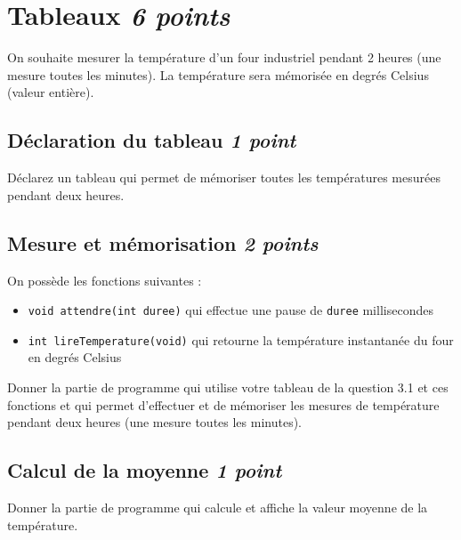 
\section{Tableaux \hfill \textit{6 points}}

On souhaite mesurer la température d'un four industriel pendant 2 heures (une mesure toutes les minutes). La température sera mémorisée en degrés Celsius (valeur entière).

\vspace{0.5em}

\subsection{Déclaration du tableau \hfill \textit{1 point}}

\UPSTIquestion
Déclarez un tableau qui permet de mémoriser toutes les températures mesurées pendant deux heures.

\espaceReponse{2cm}

\subsection{Mesure et mémorisation \hfill \textit{2 points}}

On possède les fonctions suivantes :
\begin{itemize}
    \item \texttt{void attendre(int duree)} qui effectue une pause de \texttt{duree} millisecondes
    \item \texttt{int lireTemperature(void)} qui retourne la température instantanée du four en degrés Celsius
\end{itemize}

\UPSTIquestion
Donner la partie de programme qui utilise votre tableau de la question 3.1 et ces fonctions et qui permet d'effectuer et de mémoriser les mesures de température pendant deux heures (une mesure toutes les minutes).

\espaceReponse{5cm}

\subsection{Calcul de la moyenne \hfill \textit{1 point}}

\UPSTIquestion
Donner la partie de programme qui calcule et affiche la valeur moyenne de la température.

